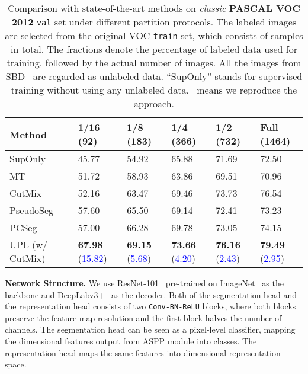 \documentclass[10pt, twocolumn, letterpaper]{article}
\begin{document}
\begin{table*}[t]
\centering
\caption{
Comparison with state-of-the-art methods on \textit{classic} \textbf{PASCAL VOC 2012} \texttt{val} set under different partition protocols. 
The labeled images are selected from the original VOC \texttt{train} set, which consists of  samples in total.
The fractions denote the percentage of labeled data used for training, followed by the actual number of images.
All the images from SBD~\cite{sbd} are regarded as unlabeled data.
``SupOnly'' stands for supervised training without using any unlabeled data.
\dag\ means we reproduce the approach.
}
\label{tab:classic}
\setlength{\tabcolsep}{13pt}
\vspace{-5pt}
\begin{tabular}{l|lllll}
\toprule
Method & 
1/16 (92) & 1/8 (183) & 1/4 (366) & 1/2 (732) & Full (1464) \\
\midrule
SupOnly & 
45.77 & 54.92 & 65.88 & 71.69 &72.50 \\
\midrule
MT~\cite{meanteacher} & 
51.72 & 58.93 & 63.86 & 69.51 & 70.96 \\
CutMix~\cite{french2019semi} & 
52.16 & 63.47 & 69.46 & 73.73 & 76.54 \\
PseudoSeg~\cite{pseudoseg} & 
57.60 & 65.50 & 69.14 & 72.41 & 73.23 \\
PCSeg~\cite{pc2seg} & 
57.00 & 66.28 & 69.78 & 73.05 & 74.15 \\
\midrule
UPL (w/ CutMix) & 
\textbf{67.98} \footnotesize{(\textcolor{blue}{15.82})} & 
\textbf{69.15} \footnotesize{(\textcolor{blue}{5.68})} & 
\textbf{73.66} \footnotesize{(\textcolor{blue}{4.20})} & 
\textbf{76.16} \footnotesize{(\textcolor{blue}{2.43})} & 
\textbf{79.49} \footnotesize{(\textcolor{blue}{2.95})} \\
\bottomrule
\end{tabular}
\vspace{-5pt}
\end{table*}

\noindent\textbf{Network Structure.} 
We use ResNet-101~\cite{resnet} pre-trained on ImageNet~\cite{imagenet} as the backbone and DeepLabv3+~\cite{deeplabv3p} as the decoder.
Both of the segmentation head and the representation head consists of two \texttt{Conv-BN-ReLU} blocks, where both blocks preserve the feature map resolution and the first block halves the number of channels.
The segmentation head can be seen as a pixel-level classifier, mapping the  dimensional features output from ASPP module into  classes.
The representation head maps the same features into  dimensional representation space.
\end{document}
